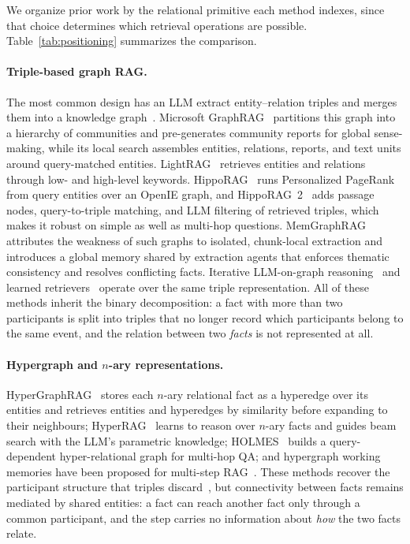 \documentclass[runningheads]{llncs}
\begin{document}
We organize prior work by the relational primitive each method indexes, since that choice determines which retrieval operations are possible. Table~\ref{tab:positioning} summarizes the comparison.

\paragraph{Triple-based graph RAG.}
The most common design has an LLM extract entity--relation triples and merges them into a knowledge graph~\cite{bian2025llm,zhang2024extract,mo2025kggen}. Microsoft GraphRAG~\cite{edge2024local} partitions this graph into a hierarchy of communities and pre-generates community reports for global sense-making, while its local search assembles entities, relations, reports, and text units around query-matched entities. LightRAG~\cite{guo2024lightrag} retrieves entities and relations through low- and high-level keywords. HippoRAG~\cite{gutierrez2024hipporag} runs Personalized PageRank from query entities over an OpenIE graph, and HippoRAG~2~\cite{gutierrez2025rag} adds passage nodes, query-to-triple matching, and LLM filtering of retrieved triples, which makes it robust on simple as well as multi-hop questions. MemGraphRAG~\cite{wu2026memgraphrag} attributes the weakness of such graphs to isolated, chunk-local extraction and introduces a global memory shared by extraction agents that enforces thematic consistency and resolves conflicting facts. Iterative LLM-on-graph reasoning~\cite{sun2023think,ma2024think,luo2023reasoning} and learned retrievers~\cite{mavromatis2024gnn} operate over the same triple representation. All of these methods inherit the binary decomposition: a fact with more than two participants is split into triples that no longer record which participants belong to the same event, and the relation between two \emph{facts} is not represented at all.

\paragraph{Hypergraph and $n$-ary representations.}
HyperGraphRAG~\cite{luo2025hypergraphrag} stores each $n$-ary relational fact as a hyperedge over its entities and retrieves entities and hyperedges by similarity before expanding to their neighbours; HyperRAG~\cite{lien2026hyperrag} learns to reason over $n$-ary facts and guides beam search with the LLM's parametric knowledge; HOLMES~\cite{panda2024holmes} builds a query-dependent hyper-relational graph for multi-hop QA; and hypergraph working memories have been proposed for multi-step RAG~\cite{zhou2025improving}. These methods recover the participant structure that triples discard~\cite{antelmi2023survey,wei2025survey}, but connectivity between facts remains mediated by shared entities: a fact can reach another fact only through a common participant, and the step carries no information about \emph{how} the two facts relate.
\end{document}
